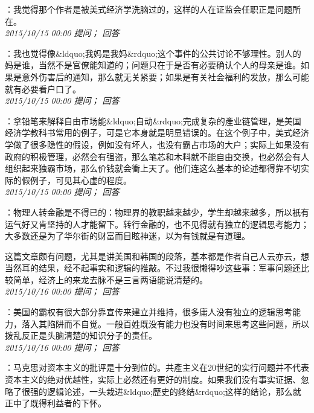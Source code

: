 \documentclass[twocolumn]{ctexart}
\begin{document}
：我觉得那个作者是被美式经济学洗脑过的，这样的人在证监会任职正是问题所在。\\

\textit{\hfill\noindent\small 2015/10/15 00:00 提问； 回答}

：我也觉得像\&ldquo;我妈是我妈\&rdquo;这个事件的公共讨论不够理性。别人的妈是谁，当然不是官僚能知道的；问题只在于是否有必要确认个人的母亲是谁。如果是意外伤害后的通知，那么就无关紧要；如果是有关社会福利的发放，那么可能就有必要看户口了。\\

\textit{\hfill\noindent\small 2015/10/15 00:00 提问； 回答}

：拿铅笔来解释自由市场能\&ldquo;自动\&rdquo;完成复杂的產业链管理，是美国经济学教科书常用的例子，可是它本身就是明显错误的。在这个例子中，美式经济学做了很多隐性的假设，例如没有坏人，也没有霸占市场的大户；实际上如果没有政府的积极管理，必然会有强盗，那么笔芯和木料就不能自由交换，也必然会有人组织起来独霸市场，那么价钱就会衝上天了。他们连这么基本的论述都得靠不切实际的假例子，可见其心虚的程度。\\

\textit{\hfill\noindent\small 2015/10/15 00:00 提问； 回答}

：物理人转金融是不得已的：物理界的教职越来越少，学生却越来越多，所以衹有运气好又肯坚持的人才能留下。转行金融的，也不见得就有独立的逻辑思考能力；大多数还是为了华尔街的财富而目眩神迷，以为有钱就是有道理。

这篇文章颇有问题，尤其是讲美国和韩国的段落，基本都是作者自己人云亦云，想当然耳的结果，经不起事实和逻辑的推敲。不过我很懒得吵这些事：军事问题还比较简单，经济上的来龙去脉不是三言两语能说清楚的。\\

\textit{\hfill\noindent\small 2015/10/16 00:00 提问； 回答}

：美国的霸权有很大部分靠宣传来建立并维持，很多庸人没有独立的逻辑思考能力，落入其陷阱而不自觉。一般百姓既没有能力也没有时间来思考这些问题，所以拨乱反正是头脑清楚的知识分子的责任。\\

\textit{\hfill\noindent\small 2015/10/16 00:00 提问； 回答}

：马克思对资本主义的批评是十分到位的。共產主义在20世纪的实行问题并不代表资本主义的绝对优越性，实际上必然还有更好的制度。如果我们没有事实证据、忽略了很强的逻辑论述，一头栽进\&ldquo;歷史的终结\&rdquo;这样的结论，那么就正中了既得利益者的下怀。\\
\end{document}
